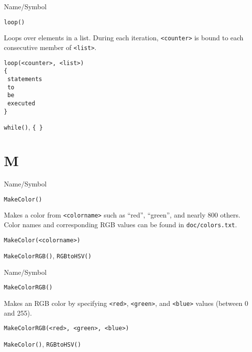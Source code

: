 \begin{desc}{Name/Symbol}
\item[Name/Symbol]	\verb+loop()+

\item[Description]	Loops over elements in a list.  During each iteration, \verb+<counter>+ is bound to each consecutive member of \verb+<list>+.

\item[Usage]		
\begin{verbatim}
loop(<counter>, <list>)
{
 statements
 to
 be	   
 executed
}
\end{verbatim}

\item[Example]	

\item[See Also]	\verb+while()+, \verb+{ }+
\end{desc}

\rl

\section{M}
\rl




\begin{desc}{Name/Symbol}
\item[Name/Symbol]	\verb+MakeColor()+

\item[Description] Makes a color from \verb+<colorname>+ such as
  ``red'', ``green'', and nearly 800 others.  Color names and
  corresponding RGB values can be found in \verb+doc/colors.txt+.

\item[Usage]
\begin{verbatim}
MakeColor(<colorname>)
\end{verbatim}

\item[Example]	

\item[See Also]	\verb+MakeColorRGB()+, \verb+RGBtoHSV()+
\end{desc}

\rl


\begin{desc}{Name/Symbol}
\item[Name/Symbol]	\verb+MakeColorRGB()+ 

\item[Description] Makes an RGB color by specifying \verb+<red>+,
  \verb+<green>+, and \verb+<blue>+ values (between 0 and 255).

\item[Usage]		
\begin{verbatim}
MakeColorRGB(<red>, <green>, <blue>)
\end{verbatim}

\item[Example]	

\item[See Also]	\verb+MakeColor()+, \verb+RGBtoHSV()+
\end{desc}

